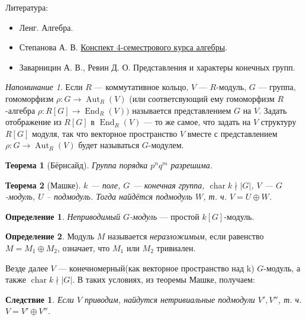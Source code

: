 \documentclass{article}
\title{}
\date{}
\newtheorem*{theorem}{Теорема}
\newtheorem*{corollary}{Следствие}
\theoremstyle{definition}
\newtheorem*{definition}{Определение}
\theoremstyle{remark}
\newtheorem*{reminder}{Напоминание}
\DeclareMathOperator{\chr}{char}
\DeclareMathOperator{\End}{End}
\DeclareMathOperator{\Aut}{Aut}
\begin{document}
\maketitle

Литература:
\begin{itemize}
\item Ленг. Алгебра.
\item Степанова А. В. \href{http://alexei.stepanov.spb.ru/students/MKNalg2.pdf}{Конспект 4-семестрового курса алгебры}.
\item Заварницин А. В., Ревин Д. О. Представления и характеры конечных групп.
\end{itemize}

\begin{reminder}
    Если $R$ --- коммутативное кольцо, $V$ --- $R$-модуль, $G$ --- группа, гомоморфизм $\rho: G \rightarrow \Aut_R(V)$ (или соответсвующий ему гомоморфизм $R$-алгебра $\rho: R[G] \rightarrow \End_R(V))$ называется представлением $G$ на $V$. Задать отображение из $R[G]$ в $\End_R(V)$ --- то же самое, что задать на $V$ структуру $R[G]$ модуля, так что векторное пространство $V$ вместе с представлением $\rho: G \rightarrow \Aut_R(V)$ будет называться $G$-модулем.
\end{reminder}

\begin{theorem}[Бёрнсайд]
Группа порядка $p^nq^m$ разрешима.
\end{theorem}

\begin{theorem}[Машке]
$k$ --- поле, $G$ --- конечная группа, $\chr k \nmid |G|$, $V$ --- $G$-модуль, $U$ -- подмодуль. Тогда найдётся подмодуль $W$, т. ч.  $V = U \oplus W$.
\end{theorem}

\begin{definition}
\textit{Неприводимый $G$-модуль} --- простой $k[G]$-модуль.
\end{definition}

\begin{definition}
Модуль $M$ называется \textit{неразложимым}, если равенство $M = M_1 \oplus M_2$, означает, что $M_1$ или $M_2$ тривиален.
\end{definition}

Везде далее $V$ --- конечномерный(как векторное пространство над k) $G$-модуль, а также $\chr k \nmid |G|$. В таких условиях, из теоремы Машке, получаем:

\begin{corollary}
     Если $V$ приводим, найдутся нетривиальные подмодули $V', V''$, т. ч. $V = V' \oplus V''$.
\end{corollary}
\end{document}

